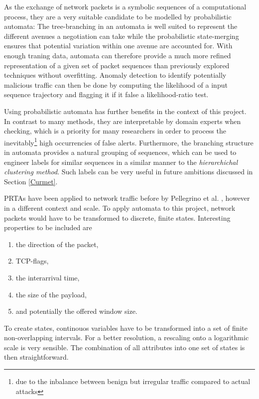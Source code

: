 \documentclass[a4paper,12pt,twoside]{report}
\begin{document}
As the exchange of network packets is a symbolic sequences of a computational process, they are a very suitable candidate to be modelled by probabilistic automata: The tree-branching in an automata is well suited to represent the different avenues a negotiation can take while the probabilistic state-merging ensures that potential variation within one avenue are accounted for. With enough traning data, automata can therefore provide a much more refined representation of a given set of packet sequences than previously explored techniques without overfitting. Anomaly detection to identify potentially malicious traffic can then be done by computing the likelihood of a input sequence trajectory and flagging it if it false a likelihood-ratio test. 

Using probabilistic automata has further benefits in the context of this project. In contrast to many methods, they are interpretable by domain experts when checking, which is a priority for many researchers in order to process the inevitably\footnote{due to the inbalance between benign but irregular traffic compared to actual attacks} high occurrencies of false alerts. Furthermore, the branching structure in automata provides a natural grouping of sequences, which can be used to engineer labels for similar sequences in a similar manner to the \textit{hierarchichal clustering method}. Such labels can be very useful in future ambitions discussed in Section \ref{Curmet}.

PRTAs have been applied to network traffic before by Pellegrino et al. \cite{pellegrino2017learning}, however in a different context and scale. To apply automata to this project, network packets would have to be transformed to discrete, finite states. Interesting properties to be included are 

\begin{enumerate}
\item the direction of the packet,
\item TCP-flags,
\item the interarrival time,
\item the size of the payload,
\item and potentially the offered window size.
\end{enumerate}

To create states, continouos variables have to be transformed into a set of finite non-overlapping intervals. For a better resolution, a rescaling onto a logarithmic scale is very sensible. The combination of all attributes into one set of states is then straightforward. 
\end{document}
